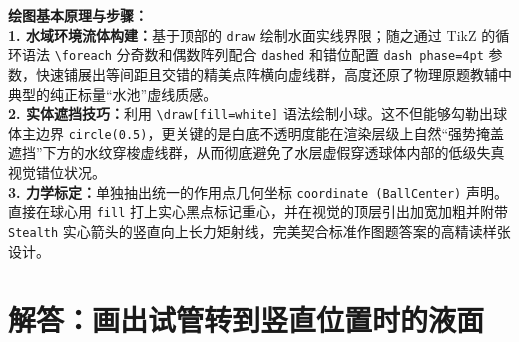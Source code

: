 \vspace{0.6cm}

{\small\color{blue!70!black}
\textbf{绘图基本原理与步骤：}\\
\textbf{1. 水域环境流体构建：}基于顶部的 \texttt{draw} 绘制水面实线界限；随之通过 TikZ 的循环语法 \texttt{\textbackslash foreach} 分奇数和偶数阵列配合 \texttt{dashed} 和错位配置 \texttt{dash phase=4pt} 参数，快速铺展出等间距且交错的精美点阵横向虚线群，高度还原了物理原题教辅中典型的纯正标量“水池”虚线质感。\\
\textbf{2. 实体遮挡技巧：}利用 \texttt{\textbackslash draw[fill=white]} 语法绘制小球。这不但能够勾勒出球体主边界 \texttt{circle(0.5)}，更关键的是白底不透明度能在渲染层级上自然“强势掩盖遮挡”下方的水纹穿梭虚线群，从而彻底避免了水层虚假穿透球体内部的低级失真视觉错位状况。\\
\textbf{3. 力学标定：}单独抽出统一的作用点几何坐标 \texttt{coordinate (BallCenter)} 声明。直接在球心用 \texttt{fill} 打上实心黑点标记重心，并在视觉的顶层引出加宽加粗并附带 \texttt{Stealth} 实心箭头的竖直向上长力矩射线，完美契合标准作图题答案的高精读样张设计。
}

\vspace{1.0cm}



\section{解答：画出试管转到竖直位置时的液面}

\vspace{0.6cm}

